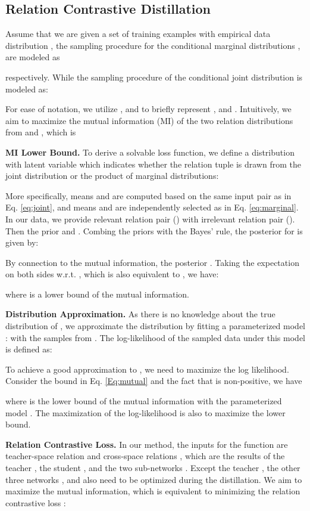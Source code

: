 \documentclass[final]{cvpr}
\begin{document}
\subsection{Relation Contrastive Distillation}
Assume that we are given a set of training examples with empirical data distribution , the sampling procedure for the conditional marginal distributions ,  are modeled as

respectively.
While the sampling procedure of the conditional joint distribution  is modeled as:

For ease of notation, we utilize ,   and  to briefly represent ,   and . Intuitively, we aim to maximize the mutual information (MI) of the two relation distributions from  and ,  which is 




 
 \noindent \textbf{MI Lower Bound.} \quad To derive a solvable loss function, we define a distribution  with latent variable  which indicates whether the relation tuple  is drawn from the joint distribution or the product of marginal distributions:
 
More specifically,  means  and  are computed based on the same input pair as in Eq.  \ref{eq:joint}, and  means  and   are independently selected as in Eq. \ref{eq:marginal}. In our data, we provide  relevant relation pair () with  irrelevant relation pair (). Then the prior  and .  Combing the priors with the Bayes' rule, the posterior for  is given by:

By connection to the mutual information, the posterior .  Taking the expectation on both sides w.r.t. , which is also equivalent to , we have:

where  is a lower bound of the mutual information.

 \noindent \textbf{Distribution Approximation.} \quad As there is no knowledge about the true distribution of , we approximate 
 the distribution
 by fitting a parameterized model :  with the samples from
.
The log-likelihood of the sampled data under this model is defined as:

To achieve a good approximation to , we need to maximize the log likelihood.  Consider the bound in Eq. \ref{Eq:mutual} and the fact that
  is non-positive, we have 
 
where  is the lower bound of the mutual information with the parameterized model .  The maximization of the log-likelihood is also to maximize the lower bound. 
 
 
\noindent \textbf{Relation Contrastive Loss.} \quad In our method, the inputs for the function   are teacher-space relation  and cross-space relations , which are the results of the teacher , the student , and the two sub-networks . Except the teacher , the other three networks ,  and  also need to be optimized during the distillation. We aim to maximize the mutual information, which is equivalent to minimizing the relation contrastive loss :
\end{document}
